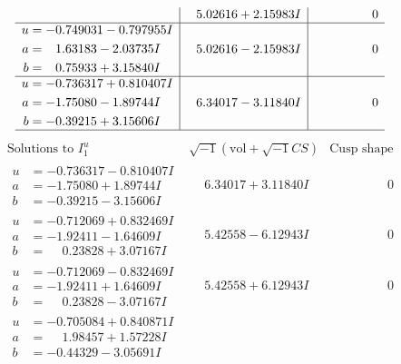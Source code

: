 \documentclass[1p]{elsarticle_modified}
\theoremstyle{definition}
\newcommand{\I}{\sqrt{-1}}
\begin{document}
$$\begin{array}{c|c|c}
 & \phantom{-}5.02616 + 2.15983 I & \phantom{-0.000000 } 0 \\ \hline\begin{aligned}
u &= -0.749031 - 0.797955 I \\
a &= \phantom{-}1.63183 - 2.03735 I \\
b &= \phantom{-}0.75933 + 3.15840 I\end{aligned}
 & \phantom{-}5.02616 - 2.15983 I & \phantom{-0.000000 } 0 \\ \hline\begin{aligned}
u &= -0.736317 + 0.810407 I \\
a &= -1.75080 - 1.89744 I \\
b &= -0.39215 + 3.15606 I\end{aligned}
 & \phantom{-}6.34017 - 3.11840 I & \phantom{-0.000000 } 0\\
 \hline 
 \end{array}$$\newpage$$\begin{array}{c|c|c}  
\text{Solutions to }I^u_{1}& \I (\text{vol} + \sqrt{-1}CS) & \text{Cusp shape}\\
 \hline 
\begin{aligned}
u &= -0.736317 - 0.810407 I \\
a &= -1.75080 + 1.89744 I \\
b &= -0.39215 - 3.15606 I\end{aligned}
 & \phantom{-}6.34017 + 3.11840 I & \phantom{-0.000000 } 0 \\ \hline\begin{aligned}
u &= -0.712069 + 0.832469 I \\
a &= -1.92411 - 1.64609 I \\
b &= \phantom{-}0.23828 + 3.07167 I\end{aligned}
 & \phantom{-}5.42558 - 6.12943 I & \phantom{-0.000000 } 0 \\ \hline\begin{aligned}
u &= -0.712069 - 0.832469 I \\
a &= -1.92411 + 1.64609 I \\
b &= \phantom{-}0.23828 - 3.07167 I\end{aligned}
 & \phantom{-}5.42558 + 6.12943 I & \phantom{-0.000000 } 0 \\ \hline\begin{aligned}
u &= -0.705084 + 0.840871 I \\
a &= \phantom{-}1.98457 + 1.57228 I \\
b &= -0.44329 - 3.05691 I\end{aligned}

\end{array}$$
\end{document}
